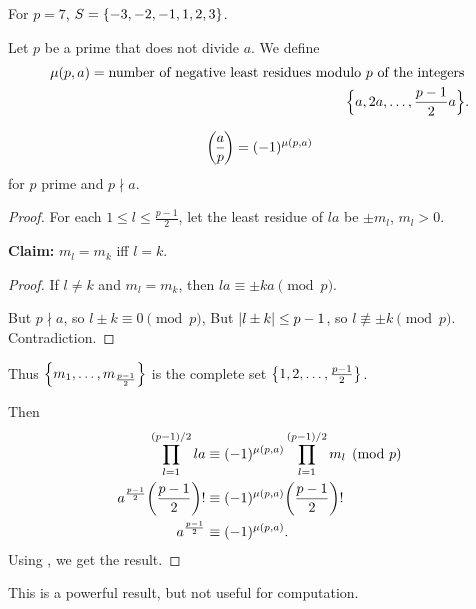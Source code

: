 \begin{example}
    For $p = 7$, $S = \set{-3, -2, -1, 1, 2, 3}$.
\end{example}
\begin{definition} \label{def:quad_res:mu}
    Let $p$ be a prime that does not divide $a$.
    We define \begin{align*}
        \mu(p, a) = \text{number of negative least residues modulo $p$ of
        the integers }\\
        \set*[\Big]{a, 2a, \dots, \frac{p-1}{2} a}.
    \end{align*}
\end{definition}

\begin{theorem} \label{thm:quad_res:gauss}
    \[
        \lgnd a p = (-1)^{\mu(p, a)}
    \] for $p$ prime and $p \nmid a$.
\end{theorem}
\begin{proof}
    For each $1 \le l \le \frac{p-1}{2}$, let the least residue of $la$ be
    $\pm m_l$, $m_l > 0$.

    \textbf{Claim:} $m_l = m_k$ iff $l = k$.
    \begin{proof}
        If $l \ne k$ and $m_l = m_k$,
        then $la \equiv \pm ka \pmod p$.

        But $p \nmid a$, so $l \pm k \equiv 0 \pmod p$,
        But $\abs{l \pm k} \le p - 1$, so $l \not\equiv \pm k \pmod p$.
        Contradiction.
    \end{proof}

    Thus $\set{m_1, \dots, m_{\frac{p-1}{2}}}$ is the complete set
    $\set{1, 2, \dots, \frac{p-1}{2}}$.

    Then \begin{align*}
        \prod_{l=1}^{(p-1)/2} la
            &\equiv (-1)^{\mu(p, a)} \prod_{l=1}^{(p-1)/2} m_l  \pmod p \\
        a^{\frac{p-1}{2}} \paren{\frac{p-1}{2}}!
            &\equiv (-1)^{\mu(p, a)} \paren{\frac{p-1}{2}}! \\
        a^{\frac{p-1}{2}} &\equiv (-1)^{\mu(p, a)}.
    \end{align*}
    Using , we get the result.
\end{proof}
\begin{remark}
    This is a powerful result, but not useful for computation.
\end{remark}


